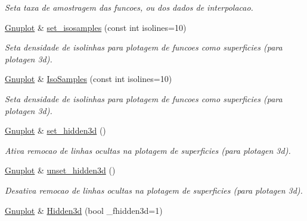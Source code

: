 \begin{DoxyCompactItemize}
\begin{DoxyCompactList}\small\item\em Seta taxa de amostragem das funcoes, ou dos dados de interpolacao. \end{DoxyCompactList}\item 
\hypertarget{classGnuplot_ab810fa4c02fb49ae197786c305b78702}{\hyperlink{classGnuplot}{Gnuplot} \& \hyperlink{classGnuplot_ab810fa4c02fb49ae197786c305b78702}{set\-\_\-isosamples} (const int isolines=10)}\label{classGnuplot_ab810fa4c02fb49ae197786c305b78702}

\begin{DoxyCompactList}\small\item\em Seta densidade de isolinhas para plotagem de funcoes como superficies (para plotagen 3d). \end{DoxyCompactList}\item 
\hypertarget{classGnuplot_a215f314f3bcc2c869e7379a9728e5f95}{\hyperlink{classGnuplot}{Gnuplot} \& \hyperlink{classGnuplot_a215f314f3bcc2c869e7379a9728e5f95}{Iso\-Samples} (const int isolines=10)}\label{classGnuplot_a215f314f3bcc2c869e7379a9728e5f95}

\begin{DoxyCompactList}\small\item\em Seta densidade de isolinhas para plotagem de funcoes como superficies (para plotagen 3d). \end{DoxyCompactList}\item 
\hypertarget{classGnuplot_a5ada5c76db0a735d3d331caa0eb4968a}{\hyperlink{classGnuplot}{Gnuplot} \& \hyperlink{classGnuplot_a5ada5c76db0a735d3d331caa0eb4968a}{set\-\_\-hidden3d} ()}\label{classGnuplot_a5ada5c76db0a735d3d331caa0eb4968a}

\begin{DoxyCompactList}\small\item\em Ativa remocao de linhas ocultas na plotagem de superficies (para plotagen 3d). \end{DoxyCompactList}\item 
\hypertarget{classGnuplot_a763ff17df1679cc2b1463b024aa89ebc}{\hyperlink{classGnuplot}{Gnuplot} \& \hyperlink{classGnuplot_a763ff17df1679cc2b1463b024aa89ebc}{unset\-\_\-hidden3d} ()}\label{classGnuplot_a763ff17df1679cc2b1463b024aa89ebc}

\begin{DoxyCompactList}\small\item\em Desativa remocao de linhas ocultas na plotagem de superficies (para plotagen 3d). \end{DoxyCompactList}\item 
\hypertarget{classGnuplot_a9004d7b6d322be1eeb32eb8eb0c25487}{\hyperlink{classGnuplot}{Gnuplot} \& \hyperlink{classGnuplot_a9004d7b6d322be1eeb32eb8eb0c25487}{Hidden3d} (bool \-\_\-fhidden3d=1)}\label{classGnuplot_a9004d7b6d322be1eeb32eb8eb0c25487}


\end{DoxyCompactItemize}
